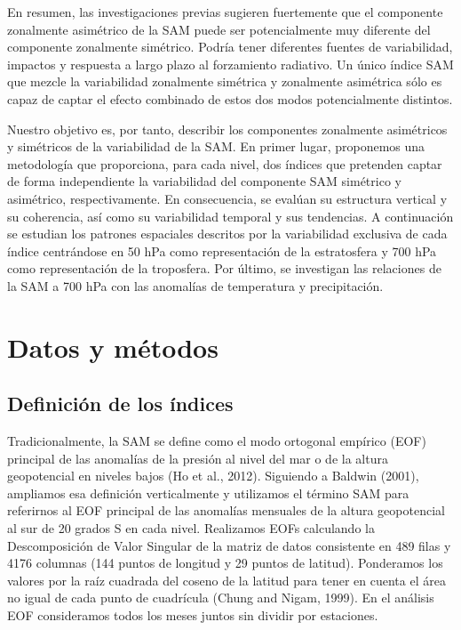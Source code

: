 \documentclass[12pt,oneside]{reedthesis}
\begin{document}
En resumen, las investigaciones previas sugieren fuertemente que el componente zonalmente asimétrico de la SAM puede ser potencialmente muy diferente del componente zonalmente simétrico.
Podría tener diferentes fuentes de variabilidad, impactos y respuesta a largo plazo al forzamiento radiativo.
Un único índice SAM que mezcle la variabilidad zonalmente simétrica y zonalmente asimétrica sólo es capaz de captar el efecto combinado de estos dos modos potencialmente distintos.

Nuestro objetivo es, por tanto, describir los componentes zonalmente asimétricos y simétricos de la variabilidad de la SAM.
En primer lugar, proponemos una metodología que proporciona, para cada nivel, dos índices que pretenden captar de forma independiente la variabilidad del componente SAM simétrico y asimétrico, respectivamente.
En consecuencia, se evalúan su estructura vertical y su coherencia, así como su variabilidad temporal y sus tendencias.
A continuación se estudian los patrones espaciales descritos por la variabilidad exclusiva de cada índice centrándose en 50 hPa como representación de la estratosfera y 700 hPa como representación de la troposfera.
Por último, se investigan las relaciones de la SAM a 700 hPa con las anomalías de temperatura y precipitación.

\hypertarget{datos-y-muxe9todos-1}{%
\section{Datos y métodos}\label{datos-y-muxe9todos-1}}

\hypertarget{definiciuxf3n-de-los-uxedndices}{%
\subsection{Definición de los índices}\label{definiciuxf3n-de-los-uxedndices}}

Tradicionalmente, la SAM se define como el modo ortogonal empírico (EOF) principal de las anomalías de la presión al nivel del mar o de la altura geopotencial en niveles bajos (Ho et al., 2012).
Siguiendo a Baldwin (2001), ampliamos esa definición verticalmente y utilizamos el término SAM para referirnos al EOF principal de las anomalías mensuales de la altura geopotencial al sur de 20 grados S en cada nivel.
Realizamos EOFs calculando la Descomposición de Valor Singular de la matriz de datos consistente en 489 filas y 4176 columnas (144 puntos de longitud y 29 puntos de latitud).
Ponderamos los valores por la raíz cuadrada del coseno de la latitud para tener en cuenta el área no igual de cada punto de cuadrícula (Chung and Nigam, 1999).
En el análisis EOF consideramos todos los meses juntos sin dividir por estaciones.
\end{document}

